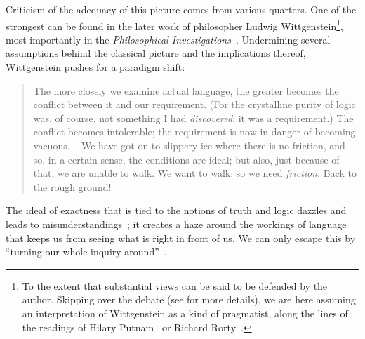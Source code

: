 \documentclass[a4paper]{article}
\begin{document}
Criticism of the adequacy of this picture comes from various quarters.
One of the strongest can be found in the later work of philosopher Ludwig Wittgenstein\footnote{To the extent that substantial views can be said to be defended by the author. Skipping over the debate (see \cite{kahane_wittgenstein_2007} for more details), we are here assuming an interpretation of Wittgenstein as a kind of pragmatist, along the lines of the readings of Hilary Putnam~\parencite*{putnam_pragmatism_1994} or Richard Rorty~\parencite*{rorty_wittgenstein_2007}.}, most importantly in the \emph{Philosophical Investigations}~\parencite*{wittgenstein_philosophical_1953}.
Undermining several assumptions behind the classical picture and the implications thereof, Wittgenstein pushes for a paradigm shift:
\begin{quote}
The more closely we examine actual language, the greater becomes the conflict between it and our requirement.
(For the crystalline purity of logic was, of course, not something I had \emph{discovered}: it was a requirement.)
The conflict becomes intolerable; the requirement is now in danger of becoming vacuous.
-- We have got on to slippery ice where there is no friction, and so, in a certain sense, the conditions are ideal; but also, just because of that, we are unable to walk.
We want to walk: so we need \emph{friction}.
Back to the rough ground!%
~\parencite[\S 107]{wittgenstein_philosophical_1953}
\end{quote}
The ideal of exactness that is tied to the notions of truth and logic dazzles and leads to misunderstandings~\parencite*[\S 100]{wittgenstein_philosophical_1953}; it creates a haze around the workings of language~\parencite*[\S 5]{wittgenstein_philosophical_1953} that keeps us from seeing what is right in front of us.
We can only escape this by ``turning our whole inquiry around''~\parencite*[\S 108]{wittgenstein_philosophical_1953}.
\end{document}
